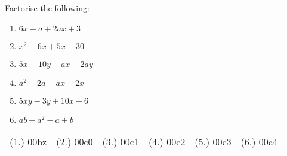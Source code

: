 
% 
% 
% 
% 


\begin{exercises}{}{Factorise the following:
\begin{multicols}{2}
\begin{enumerate}[itemsep=5pt, label=\textbf{\arabic*}. ] 
\item $6x+a+2ax+3$
\item ${x}^{2}-6x+5x-30$
\item $5x+10y-ax-2ay$
\item ${a}^{2}-2a-ax+2x$
\item $5xy-3y+10x-6$
\item $ab - a^{2} - a + b$
\end{enumerate}
\end{multicols}
\practiceinfo 
\par 
\par \begin{tabular}[h]{cccccc}
(1.) 00bz&  (2.) 00c0&  (3.) 00c1&  (4.) 00c2&  (5.) 00c3& (6.) 00c4\end{tabular}
}
\end{exercises}




